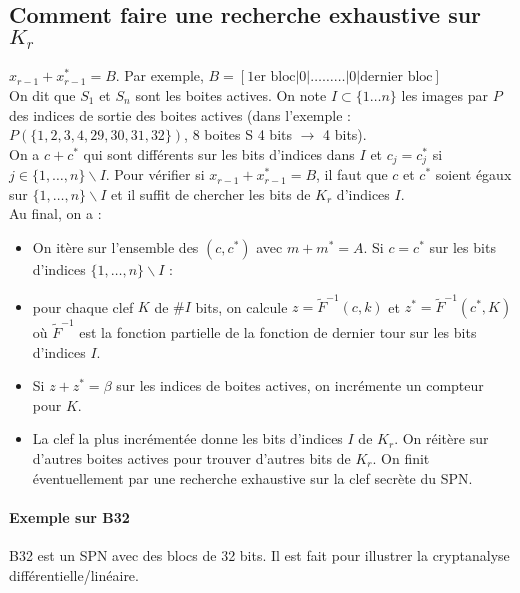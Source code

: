 \documentclass[12pt,a4paper]{report}
\begin{document}
\subsection{Comment faire une recherche exhaustive sur $K_r$}
\begin{center}
  \scalebox{0.6}{}	
\end{center}
$x_{r-1}+x_{r-1}^*=B$. Par exemple, $B=[\mbox{1er bloc} | 0 |\ldots \ldots \ldots | 0 | \mbox{dernier bloc}]$\\

On dit que $S_1$ et $S_n$ sont les boites actives. On note $I \subset \{1\ldots n\}$ les images par $P$ des indices de sortie des boites actives (dans l'exemple : $P(\{1,2,3,4,29,30,31,32\})$, 8 boites S 4 bits $\rightarrow$ 4 bits).\\

On a $c+c^*$ qui sont différents sur les bits d'indices dans $I$ et $c_j = c_j^*$ si $j \in \{1,\ldots,n\}\backslash I$. Pour vérifier si $x_{r-1}+x_{r-1}^* = B$, il faut que $c$ et $c^*$ soient égaux sur $\{1,\ldots,n\}\backslash I$ et il suffit de chercher les bits de $K_r$ d'indices $I$.\\
Au final, on a :
\begin{itemize}
\item On itère sur l'ensemble des $(c,c^*)$ avec $m+m^*=A$. Si $c=c^*$ sur les bits d'indices $\{1,\ldots,n\}\backslash I$ :
\item pour chaque clef $K$ de $\# I$ bits, on calcule $z=\tilde{F}^{-1}(c,k)$ et $z^*=\tilde{F}^{-1}(c^*,K)$ où $\tilde{F}^{-1}$ est la fonction partielle de la fonction de dernier tour sur les bits d'indices $I$.
\item Si $z+z^*=\beta$ sur les indices de boites actives, on incrémente un compteur pour $K$.
\item La clef la plus incrémentée donne les bits d'indices $I$ de $K_r$. On réitère sur d'autres boites actives pour trouver d'autres bits de $K_r$. On finit éventuellement par une recherche exhaustive sur la clef secrète du SPN.
\end{itemize}
\paragraph{Exemple sur B32}
B32 est un SPN avec des blocs de 32 bits. Il est fait pour illustrer la cryptanalyse différentielle/linéaire.\\
\end{document}
